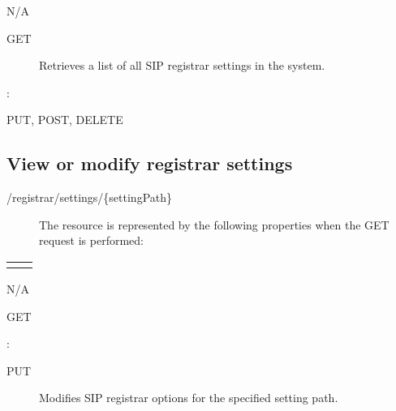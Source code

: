 \documentclass[letterpaper,10pt,english]{sphinxmanual}
\begin{document}
 N/A
\begin{description}
\item[{ GET}] \leavevmode
Retrieves a list of all SIP registrar settings in the system.

\end{description}

:

\begin{sphinxVerbatim}[commandchars=\\\{\}]
\end{sphinxVerbatim}

 PUT, POST, DELETE


\subsection{View or modify registrar settings}
\label{\detokenize{restapi:view-or-modify-registrar-settings}}
 /registrar/settings/\{settingPath\}
\begin{description}
\item[{}] \leavevmode
The resource is represented by the following properties when the GET request is performed:

\end{description}


\begin{savenotes}\sphinxattablestart
\centering
\begin{tabulary}{\linewidth}[t]{|T|T|}
\hline

&
\\
\hline&\\
\hline
\end{tabulary}
\par
\sphinxattableend\end{savenotes}

 N/A

 GET

:

\begin{sphinxVerbatim}[commandchars=\\\{\}]
\end{sphinxVerbatim}
\begin{description}
\item[{ PUT}] \leavevmode
Modifies SIP registrar options for the specified setting path.

\end{description}
\end{document}
